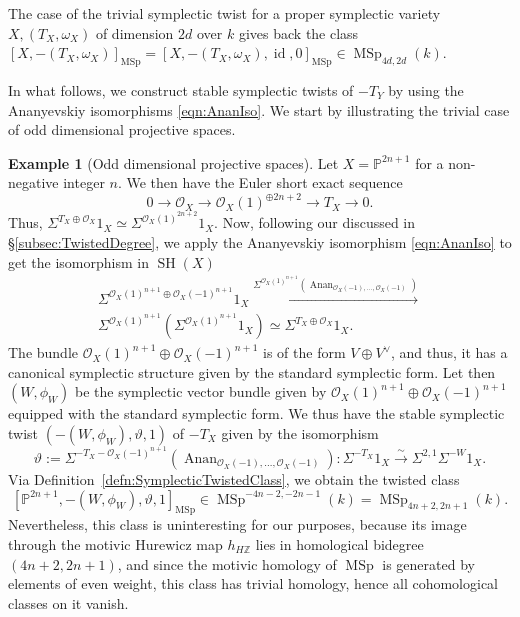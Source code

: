 \documentclass[10pt]{amsart}
\theoremstyle{definition}
\newtheorem{exmp}[defn]{Example}
\theoremstyle{plain}
\numberwithin{equation}{section}
\newcommand{\0}{\emptyset}
\newcommand{\sO}{{\mathcal O}}
\renewcommand{\P}{{\mathbb P}}
\newcommand{\Z}{{\mathbb Z}}
\newcommand{\MSp}{{\operatorname{MSp}}}
\newcommand{\SH}{{\operatorname{SH}}}
\newcommand{\id}{{\operatorname{id}}}
\newcommand{\Anan}{{\operatorname{Anan}}}
\begin{document}
The case of the trivial symplectic twist for a proper symplectic variety $X, (T_X,\omega_X)$ of dimension $2d$ over $k$ gives back the class $[X, -(T_X,\omega_X)]_\MSp=[X, -(T_X,\omega_X),\id,0]_\MSp\in \MSp_{4d,2d}(k)$.

In what follows, we construct stable symplectic twists of $-T_Y$ by using the Ananyevskiy isomorphisms \eqref{eqn:AnanIso}. We start by illustrating the trivial case of odd dimensional projective spaces.

\begin{exmp}[Odd dimensional projective spaces]
\label{exmp:symplprojspaces}
Let $X=\mathbb{P}^{2n+1}$ for a non-negative integer $n$. We then have the Euler short exact sequence
$$0 \to \mathcal{O}_X \to \mathcal{O}_X(1)^{\oplus 2n+2} \to T_X \to 0.$$
Thus, $\Sigma^{T_X \oplus \mathcal{O}_X}1_X \simeq \Sigma^{\mathcal{O}_X(1)^{2n +2}}1_X$. Now, following our discussed in \S \ref{subsec:TwistedDegree}, we apply the Ananyevskiy isomorphism \eqref{eqn:AnanIso} to get 
the isomorphism in $\SH(X)$
\begin{multline*}
 \Sigma^{\sO_X(1)^{n+1}\oplus \sO_X(-1)^{n+1}}1_X
 \xrightarrow{\Sigma^{\sO_X(1)^{n+1}}(\Anan_{\sO_X(-1),\ldots,\sO_X(-1)})}\\
 \Sigma^{\sO_X(1)^{n+1}}(\Sigma^{\sO_X(1)^{n+1}}1_X)\simeq
 \Sigma^{T_X\oplus \sO_X}1_X.
 \end{multline*}
 The bundle $\mathcal{O}_X(1)^{n+1}\oplus \mathcal{O}_X(-1)^{n+1}$ is of the form $V \oplus V^{\vee}$, and thus, it has a canonical symplectic structure given by the standard symplectic form.
Let then $(W,\phi_W)$ be the symplectic vector bundle given by $\mathcal{O}_X(1)^{n+1}\oplus \mathcal{O}_X(-1)^{n+1}$ equipped with the standard symplectic form. We thus have the 
stable symplectic twist $(-(W,\phi_W), \vartheta, 1)$ of $-T_X$ given by the isomorphism
\[
\vartheta:=\Sigma^{-T_X- \sO_X(-1)^{n+1}}(\Anan_{\sO_X(-1),\ldots,\sO_X(-1)}):\Sigma^{-T_X}1_X\xrightarrow{\sim} \Sigma^{2,1}\Sigma^{-W}1_X.
\]
Via Definition~\ref{defn:SymplecticTwistedClass}, we obtain the twisted class
\[
[\P^{2n+1}, -(W,\phi_W), \vartheta, 1]_\MSp\in \MSp^{-4n-2, -2n-1}(k)=\MSp_{4n+2, 2n+1}(k).
\]
Nevertheless, this class is uninteresting for our purposes, because its image through the motivic Hurewicz map $h_{H\Z}$ lies in homological bidegree $(4n+2,2n+1)$, and since the motivic homology of $\MSp$ is generated by elements of even weight, this class has trivial homology, hence all cohomological classes on it vanish.
\end{exmp}
\end{document}
